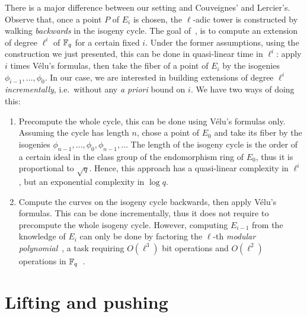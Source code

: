 \documentclass{sig-alternate}
\begin{document}
\begin{remark}
  \label{rk:cycle}
  There is a major difference between our setting and Couveignes' and
  Lercier's. Observe that, once a point $P$ of $E_i$ is chosen, the
  $\ell$-adic tower is constructed by walking \emph{backwards} in the
  isogeny cycle. The goal of~\cite{couveignes+lercier11}, is to
  compute an extension of degree $\ell^i$ of $\mathbb{F}_q$ for a certain
  fixed $i$. Under the former assumptions, using the construction we
  just presented, this can be done in quasi-linear time in $\ell^i$:
  apply $i$ times Vélu's formulas, then take the fiber of a point of
  $E_i$ by the isogenies $\phi_{i-1}, \ldots, \phi_0$. In our case, we
  are interested in building extensions of degree $\ell^i$
  \emph{incrementally}, i.e.\ without any \emph{a priori} bound on
  $i$. We have two ways of doing this:
  \begin{enumerate}
  \item Precompute the whole cycle, this can be done using Vélu's
    formulas only. Assuming the cycle has length $n$, chose a point of
    $E_0$ and take its fiber by the isogenies $\phi_{n-1}, \ldots,
    \phi_0, \phi_{n-1}, \ldots$ The length of the isogeny cycle is the
    order of a certain ideal in the class group of the endomorphism
    ring of $E_0$, thus it is proportional to $\sqrt{q}$. Hence, this
    approach has a quasi-linear complexity in $\ell^i$, but an
    exponential complexity in $\log q$.
  \item Compute the curves on the isogeny cycle backwards, then apply
    Vélu's formulas. This can be done incrementally, thus it does not
    require to precompute the whole isogeny cycle. However, computing
    $E_{i-1}$ from the knowledge of $E_i$ can only be done by
    factoring the $\ell$-th \emph{modular polynomial}~\cite{schoof95},
    a task requiring $O(\ell^3)$ bit operations and $O(\ell^2)$
    operations in $\mathbb{F}_q$~\cite{sutherland10:modpol}.
  \end{enumerate}
\end{remark}


\section{Lifting and pushing}
\label{sec:lift-push}
\end{document}
